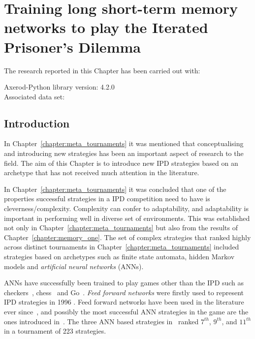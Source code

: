 \chapter{Training long short-term memory networks to play the Iterated Prisoner's Dilemma}\label{chapter:lstm}

\begin{center}
    The research reported in this Chapter has been carried out with:

    Axerod-Python library version: 4.2.0 \\
    Associated data set: \\ \vspace{.5cm} %
\end{center}

\hrulefill

\section{Introduction}

In Chapter~\ref{chapter:meta_tournaments} it was mentioned that conceptualising
and introducing new strategies has been an important aspect of research to the
field. The aim of this Chapter is to introduce new IPD strategies based on an
archetype that has not received much attention in the literature.

In Chapter~\ref{chapter:meta_tournaments} it was concluded that one of the
properties successful strategies in a IPD competition need to have is
cleverness/complexity. Complexity can confer to adaptability, and adaptability
is important in performing well in diverse set of environments. This was
established not only in Chapter~\ref{chapter:meta_tournaments} but also from the
results of Chapter~\ref{chapter:memory_one}. The set of complex strategies that
ranked highly across distinct tournaments in
Chapter~\ref{chapter:meta_tournaments} included strategies based on archetypes
such as finite state automata, hidden Markov models and \textit{artificial
neural networks} (ANNs).

ANNs have successfully been trained to play games other than the IPD such as
checkers~\cite{Chellapilla1999}, chess~\cite{Fogel2004} and
Go~\cite{Silver2016}. \textit{Feed forward networks} were firstly used to represent IPD
strategies in 1996 \cite{Harrald1996}. Feed forward networks have been used in
the literature ever since~\cite{Ashlock2008, Ashlock2006a, Darwen2001,
Franken2005}, and possibly the most successful ANN strategies in the game are
the ones introduced in~\cite{Harper2017}. The three ANN based strategies
in~\cite{Harper2017} ranked \(7^{th}\), \(9^{th}\), and \(11^{th}\) in a
tournament of 223 strategies.

